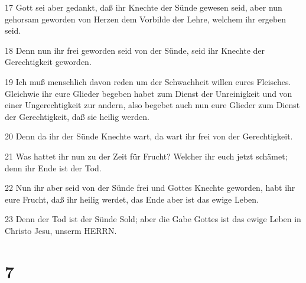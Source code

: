 \par 17 Gott sei aber gedankt, daß ihr Knechte der Sünde gewesen seid, aber nun gehorsam geworden von Herzen dem Vorbilde der Lehre, welchem ihr ergeben seid.
\par 18 Denn nun ihr frei geworden seid von der Sünde, seid ihr Knechte der Gerechtigkeit geworden.
\par 19 Ich muß menschlich davon reden um der Schwachheit willen eures Fleisches. Gleichwie ihr eure Glieder begeben habet zum Dienst der Unreinigkeit und von einer Ungerechtigkeit zur andern, also begebet auch nun eure Glieder zum Dienst der Gerechtigkeit, daß sie heilig werden.
\par 20 Denn da ihr der Sünde Knechte wart, da wart ihr frei von der Gerechtigkeit.
\par 21 Was hattet ihr nun zu der Zeit für Frucht? Welcher ihr euch jetzt schämet; denn ihr Ende ist der Tod.
\par 22 Nun ihr aber seid von der Sünde frei und Gottes Knechte geworden, habt ihr eure Frucht, daß ihr heilig werdet, das Ende aber ist das ewige Leben.
\par 23 Denn der Tod ist der Sünde Sold; aber die Gabe Gottes ist das ewige Leben in Christo Jesu, unserm HERRN.

\chapter{7}

